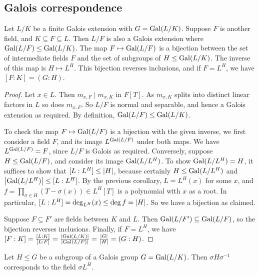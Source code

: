 \subsection{Galois correspondence}
\begin{theorem}
	Let \( L / K \) be a finite Galois extension with \( G = \operatorname{Gal}(L / K) \).
	Suppose \( F \) is another field, and \( K \subseteq F \subseteq L \).
	Then \( L / F \) is also a Galois extension where \( \operatorname{Gal}(L / F) \leq \operatorname{Gal}(L / K) \).
	The map \( F \mapsto \operatorname{Gal}(L / F) \) is a bijection between the set of intermediate fields \( F \) and the set of subgroups of \( H \leq \operatorname{Gal}(L/K) \).
	The inverse of this map is \( H \mapsto L^H \).
	This bijection reverses inclusions, and if \( F = L^H \), we have \( [F : K] = (G : H) \).
\end{theorem}
\begin{proof}
	Let \( x \in L \).
	Then \( m_{x,F} \mid m_{x,K} \) in \( F[T] \).
	As \( m_{x,K} \) splits into distinct linear factors in \( L \) so does \( m_{x,F} \).
	So \( L / F \) is normal and separable, and hence a Galois extension as required.
	By definition, \( \operatorname{Gal}(L / F) \leq \operatorname{Gal}(L / K) \).

	To check the map \( F \mapsto \operatorname{Gal}(L / F) \) is a bijection with the given inverse, we first consider a field \( F \), and its image \( L^{\operatorname{Gal}(L / F)} \) under both maps.
	We have \( L^{\operatorname{Gal}(L / F)} = F \), since \( L / F \) is Galois as required.
	Conversely, suppose \( H \leq \operatorname{Gal}(L / F) \), and consider its image \( \operatorname{Gal}(L / L^H) \).
	To show \( \operatorname{Gal}(L / L^H) = H \), it suffices to show that \( [L : L^H] \leq \abs{H} \), because certainly \( H \leq \operatorname{Gal}(L / L^H) \) and \( \abs{\operatorname{Gal}(L / L^H)} \leq [L : L^H] \).
	By the previous corollary, \( L = L^H(x) \) for some \( x \), and \( f = \prod_{\sigma \in H} (T - \sigma(x)) \in L^H[T] \) is a polynomial with \( x \) as a root.
	In particular, \( [L : L^H] = \deg_{L^H}(x) \leq \deg f = \abs{H} \).
	So we have a bijection as claimed.

	Suppose \( F \subseteq F' \) are fields between \( K \) and \( L \).
	Then \( \operatorname{Gal}(L/F') \subseteq \operatorname{Gal}(L/F) \), so the bijection reverses inclusions.
	Finally, if \( F = L^H \), we have \( [F : K] = \frac{[L : K]}{[L : F]} = \frac{\abs{\operatorname{Gal}(L / K)}}{\abs{\operatorname{Gal}(L / F)}} = \frac{\abs{G}}{\abs{H}} = (G : H) \).
\end{proof}
\begin{theorem}
	Let \( H \leq G \) be a subgroup of a Galois group \( G = \operatorname{Gal}(L / K) \).
	Then \( \sigma H \sigma^{-1} \) corresponds to the field \( \sigma L^H \).
\end{theorem}
